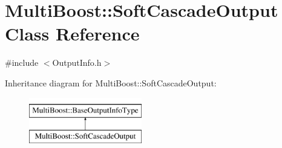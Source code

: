 \hypertarget{classMultiBoost_1_1SoftCascadeOutput}{\section{Multi\-Boost\-:\-:Soft\-Cascade\-Output Class Reference}
\label{classMultiBoost_1_1SoftCascadeOutput}
}


{\ttfamily \#include $<$Output\-Info.\-h$>$}

Inheritance diagram for Multi\-Boost\-:\-:Soft\-Cascade\-Output\-:\begin{figure}[H]
\begin{center}
\leavevmode
\includegraphics[height=2.000000cm]{classMultiBoost_1_1SoftCascadeOutput}
\end{center}
\end{figure}
